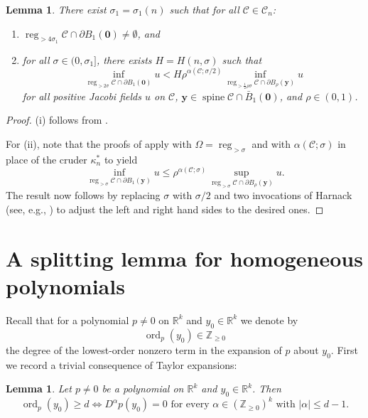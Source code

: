 \documentclass[11pt, letterpaper, reqno]{amsart}
\numberwithin{equation}{section}
\newtheorem{Lem}[Def]{Lemma}
\theoremstyle{remark}
\newcommand{\RR}{\mathbb{R}}
\newcommand{\ZZ}{\mathbb{Z}}
\newcommand{\cC}{\mathcal{C}}
\newcommand{\mbfy}{\mathbf{y}}
\newcommand{\reg}{\operatorname{reg}}
\newcommand{\spine}{\operatorname{spine}}
\newcommand{\Ord}{\operatorname{ord}}
\newcommand{\orig}{\mathbf{0}}
\begin{document}
\begin{Lem} \label{lemm:jacobi.decay.cone}
	There exist $\sigma_1 = \sigma_1(n)$ such that for all $\cC \in \mathscr{C}_n$:
	\begin{enumerate}
		\item[(i)] $\reg_{>4 \sigma_1} \cC \cap \partial B_1(\orig) \neq \emptyset$, and
		\item[(ii)] for all $\sigma \in (0, \sigma_1]$, there exists $H = H(n, \sigma)$ such that
			\[ \inf_{\reg_{> 2 \sigma} \cC \cap \partial B_1(\orig)} u < H \rho^{\alpha(\cC; \sigma/2)} \inf_{\reg_{> \frac12 \rho \sigma} \cC \cap \partial B_\rho(\mbfy)} u \]
			 for all positive Jacobi fields $u$ on $\cC$, $\mbfy \in \spine \cC \cap \bar B_1(\orig)$, and $\rho \in (0,1)$.
	\end{enumerate}
\end{Lem}
\begin{proof}
    (i) follows from \cite[Proposition 3.10]{CMS:generic.9.10}.

    For (ii), note that the proofs of \cite[Lemmas 3.8, B.1]{CMS:generic.9.10} apply with $\Omega = \reg_{>\sigma}$ and with $\alpha(\cC; \sigma)$ in place of the cruder $\kappa_n^*$ to yield
    \[ \inf_{\reg_{> \sigma} \cC \cap \partial B_1(\mbfy)} u \leq \rho^{\alpha(\cC; \sigma)} \sup_{\reg_{> \sigma} \cC \cap \partial B_\rho(\mbfy)} u. \]
    The result now follows by replacing $\sigma$ with $\sigma/2$ and two invocations of Harnack (see, e.g., \cite[Proposition 3.10]{CMS:generic.9.10}) to adjust the left and right hand sides to the desired ones.
\end{proof}


\section{A splitting lemma for homogeneous polynomials}
    
    Recall that for a polynomial $p \neq 0$ on $\RR^k$ and $y_0 \in \RR^k$ we denote by
    \[ \Ord_p(y_0) \in \ZZ_{\geq 0} \]
    the degree of the lowest-order nonzero term in the expansion of $p$ about $y_0$. First we record a trivial consequence of Taylor expansions:
    
    \begin{Lem} \label{lemm:polynomial.ord.characterization}
    	Let $p \neq 0$ be a polynomial on $\RR^k$ and $y_0 \in \RR^k$. Then
	\[ \Ord_p(y_0) \geq d \iff  D^\alpha p(y_0)=0 \text{ for every } \alpha \in (\ZZ_{\geq 0})^k \text{ with } |\alpha| \leq d-1. \]
    \end{Lem}
    
\end{document}

